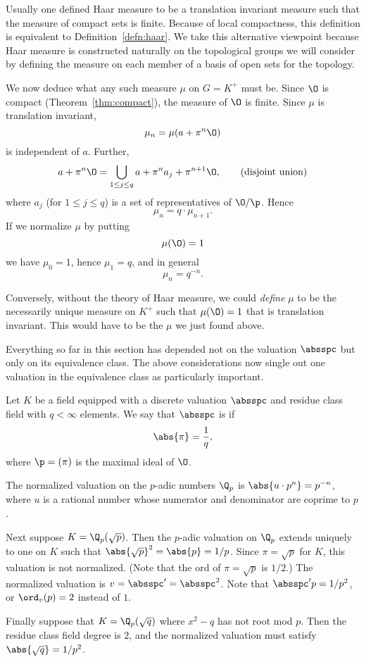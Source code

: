 \begin{remark}
  Usually one defined Haar measure to be a translation invariant
  measure such that the measure of compact sets is finite.  Because of
  local compactness, this definition is equivalent to
  Definition~\ref{defn:haar}.  We take this alternative viewpoint
  because Haar measure is constructed naturally on the topological
  groups we will consider by defining the measure on each member of a
  basis of open sets for the topology.
\end{remark}

We now deduce what any such measure $\mu$ on $G=K^+$ must be.  Since
$\O$ is compact (Theorem~\ref{thm:compact}), the measure of $\O$ is
finite.  Since $\mu$ is translation invariant,
$$
  \mu_n = \mu(a + \pi^n \O)
$$
is independent of $a$.  Further, 
$$
a + \pi^n\O = \bigcup_{1\leq j\leq q} a + \pi^n a_j + \pi^{n+1}\O,
\qquad\text{(disjoint union)}
$$
where $a_j$ (for $1\leq j \leq q$) is a set of representatives of
$\O/\p$. Hence
$$
 \mu_n = q\cdot \mu_{n+1}.
$$
If we normalize $\mu$ by putting 
$$
 \mu(\O) = 1
 $$
 we have $\mu_0 = 1$, hence $\mu_1 = q$, and in general $$\mu_n =
 q^{-n}.$$
 
 Conversely, without the theory of Haar measure, we could {\em define}
 $\mu$ to be the necessarily unique measure on $K^+$ such that
 $\mu(\O)=1$ that is translation invariant.  This would have to be the
 $\mu$ we just found above.
 
 Everything so far in this section has depended not on the valuation
 $\absspc$ but only on its equivalence class.  The above
 considerations now single out one valuation in the equivalence class
 as particularly important.
\begin{definition}\label{defn:normalized}
Let $K$ be a field equipped with a discrete valuation $\absspc$
and residue class field with $q<\infty$ elements.  We say that
$\absspc$ is  if 
$$
\abs{\pi} = \frac{1}{q},
$$
where $\p=(\pi)$ is the maximal ideal of $\O$.
\end{definition}
\begin{example}
The normalized valuation on the $p$-adic numbers $\Q_p$ is 
$\abs{u\cdot p^n} = p^{-n}$, where $u$ is a rational number
whose numerator and denominator are coprime to $p$.

Next suppose $K=\Q_p(\sqrt{p})$.  Then the $p$-adic valuation on 
$\Q_p$ extends uniquely to one on $K$ such that 
$\abs{\sqrt{p}}^2 = \abs{p} = 1/p$.  Since $\pi=\sqrt{p}$
for $K$, this valuation is not normalized.  (Note that
the ord of $\pi=\sqrt{p}$ is $1/2$.)
The normalized valuation is $v=\absspc' = \absspc^2$.  Note that 
$\absspc'{p} = 1/p^2$, or $\ord_v(p)=2$ instead of $1$.

Finally suppose that $K=\Q_p(\sqrt{q})$ where $x^2-q$
has not root mod $p$.  Then the residue class field 
degree is $2$, and the normalized valuation must
satisfy $\abs{\sqrt{q}} = 1/p^2$.
\end{example}

